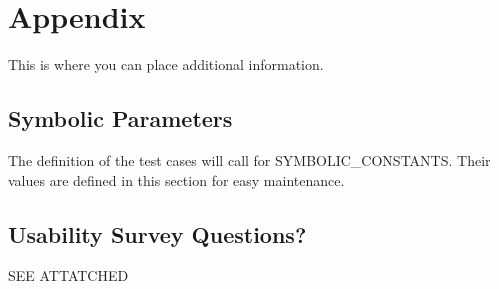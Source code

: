 \documentclass[12pt, titlepage]{article}
\begin{document}




\newpage

\section{Appendix}

This is where you can place additional information.

\subsection{Symbolic Parameters}

The definition of the test cases will call for SYMBOLIC\_CONSTANTS.
Their values are defined in this section for easy maintenance.

\subsection{Usability Survey Questions?}

SEE ATTATCHED
\end{document}
